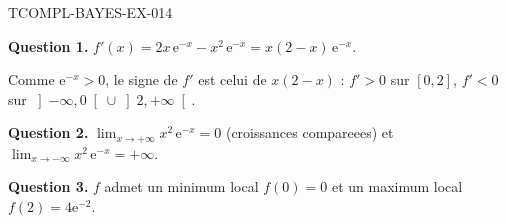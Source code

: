 \begin{corrige}{TCOMPL-BAYES-EX-014}

\textbf{Question 1.} $f'(x) = 2x\,\mathrm{e}^{-x} - x^2\,\mathrm{e}^{-x} = x(2-x)\,\mathrm{e}^{-x}$.


Comme $\mathrm{e}^{-x} > 0$, le signe de $f'$ est celui de $x(2-x)$ :
$f' > 0$ sur $[0,2]$, $f' < 0$ sur $\left]-\infty,0\right[ \cup \left]2,+\infty\right[$.

\textbf{Question 2.} $\lim_{x \to +\infty} x^2\,\mathrm{e}^{-x} = 0$ (croissances compareees) et $\lim_{x \to -\infty} x^2\,\mathrm{e}^{-x} = +\infty$.

\textbf{Question 3.} $f$ admet un minimum local $f(0) = 0$ et un maximum local $f(2) = 4\mathrm{e}^{-2}$.

\end{corrige}
